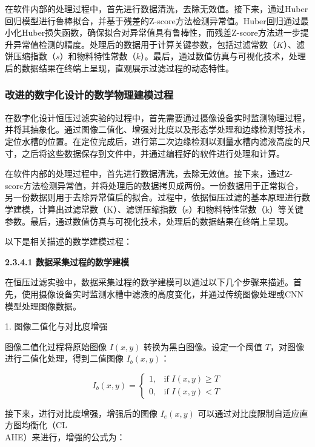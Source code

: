 在软件内部的处理过程中，首先进行数据清洗，去除无效值。接下来，通过Huber回归模型进行鲁棒拟合，并基于残差的Z-score方法检测异常值。Huber回归通过最小化Huber损失函数，确保拟合对异常值具有鲁棒性，而残差Z-score方法进一步提升异常值检测的精度。处理后的数据用于计算关键参数，包括过滤常数（\(K\)）、滤饼压缩指数（\(s\)）和物料特性常数（\(k\)）。最后，通过数值仿真与可视化技术，处理后的数据结果在终端上呈现，直观展示过滤过程的动态特性。

\subsubsection{改进的数字化设计的数学物理建模过程}


在数字化设计恒压过滤实验的过程中，首先需要通过摄像设备实时监测物理过程，并将其抽象化。通过图像二值化、增强对比度以及形态学处理和边缘检测等技术，定位水槽的位置。在定位完成后，进行第二次边缘检测以测量水槽内滤液高度的尺寸，之后将这些数据保存到文件中，并通过编程好的软件进行处理和计算。

在软件内部的处理过程中，首先进行数据清洗，去除无效值。接下来，通过Z-score方法检测异常值，并将处理后的数据拷贝成两份。一份数据用于正常拟合，另一份数据则用于去除异常值后的拟合。过程中，依据恒压过滤的基本原理进行数学建模，计算出过滤常数（K）、滤饼压缩指数（s）和物料特性常数（k）等关键参数。最后，通过数值仿真与可视化技术，处理后的数据结果在终端上呈现。

以下是相关描述的数学建模过程：

{\noindent \wuhao \rmfamily {} \textbf{2.3.4.1 \quad 数据采集过程的数学建模}}

在恒压过滤实验中，数据采集过程的数学建模可以通过以下几个步骤来描述。首先，使用摄像设备实时监测水槽中滤液的高度变化，并通过传统图像处理或CNN模型处理图像数据。

1. 图像二值化与对比度增强

图像二值化过程将原始图像 \( I(x, y) \) 转换为黑白图像。设定一个阈值 \( T \)，对图像进行二值化处理，得到二值图像 \( I_b(x, y) \)：

\begin{equation}
I_b(x, y) = 
\begin{cases} 
1, & \text{if } I(x, y) \geq T \\
0, & \text{if } I(x, y) < T
\end{cases}
\end{equation}

接下来，进行对比度增强，增强后的图像 \( I_e(x, y) \) 可以通过对比度限制自适应直方图均衡化\textsuperscript{\cite{ref15,ref18}}（CL\\AHE）来进行，增强的公式为：

